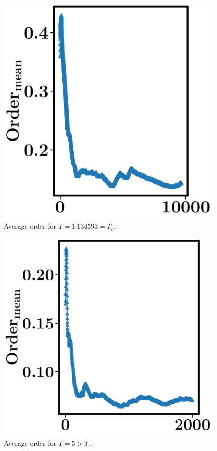 \documentclass[12pt,letterpaper]{article}
\begin{document}
\begin{figure}[ht]
  \centering
    \includegraphics[width=\textwidth]{figures/plot_order_T1-134593.pdf}
    \caption{Average order for $T = 1.134593 = T_c$.}
     \label{fig:E0.5}
\end{figure}


\begin{figure}[ht]
  \centering
    \includegraphics[width=\textwidth]{figures/plot_order_T5.pdf}
    \caption{Average order for $T = 5 > T_c$.}
     \label{fig:E0.5}
\end{figure}
\end{document}
